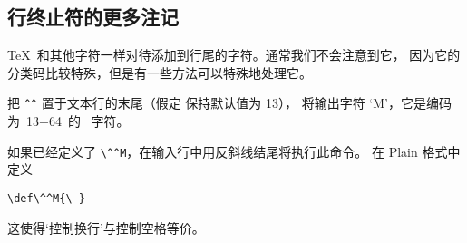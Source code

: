 \documentclass{book}
\begin{document}
\subsection{行终止符的更多注记}

\TeX\ 和其他字符一样对待添加到行尾的字符。通常我们不会注意到它，
因为它的分类码比较特殊，但是有一些方法可以特殊地处理它。

\begin{example}
把 \verb>^^> 置于文本行的末尾（假定  保持默认值为 13），
将输出字符 `M'，它是编码为~13+64~的 \ascii\ 字符。
\end{example}

\begin{example} 如果已经定义了 \verb>\^^M>，在输入行中用反斜线结尾将执行此命令。
在 Plain 格式中定义
\begin{verbatim}
\def\^^M{\ }
\end{verbatim}
这使得`控制换行'与控制空格等价。
\end{example}

\end{document}
